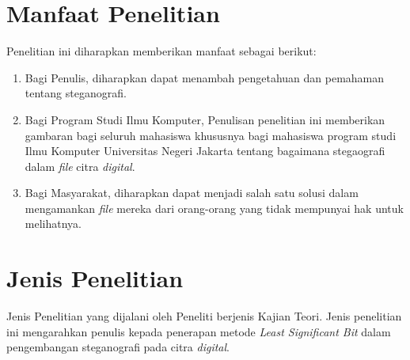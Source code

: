 \section{Manfaat Penelitian}
Penelitian ini diharapkan memberikan manfaat sebagai berikut:
	\begin{enumerate}
		\item Bagi Penulis, diharapkan dapat menambah pengetahuan dan pemahaman tentang steganografi.
		\item Bagi Program Studi Ilmu Komputer, Penulisan penelitian ini memberikan gambaran bagi seluruh mahasiswa khususnya bagi mahasiswa program studi Ilmu Komputer Universitas Negeri Jakarta tentang bagaimana stegaografi dalam \emph{file} citra \emph{digital}.
		\item Bagi Masyarakat, diharapkan dapat menjadi salah satu solusi dalam mengamankan \emph{file} mereka dari orang-orang yang tidak mempunyai hak untuk melihatnya.   	
	\end{enumerate}

\section{Jenis Penelitian}
Jenis Penelitian yang dijalani oleh Peneliti berjenis Kajian Teori. Jenis penelitian ini mengarahkan penulis kepada penerapan metode \emph{Least Significant Bit} dalam pengembangan steganografi pada citra \emph{digital}.		
\begin{comment}

\end{comment}
